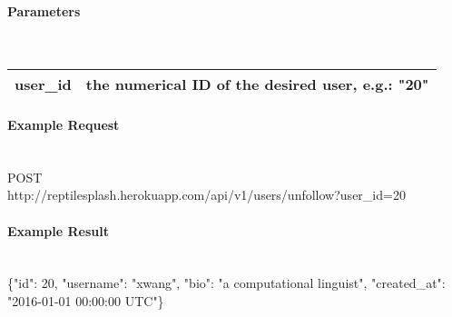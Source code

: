\documentclass{article}
\begin{document}
	\paragraph{Parameters} \mbox{} \\
	\begin{tabular}{ll}
		\hline
		user\_id & the numerical ID of the desired user, e.g.: "20" \\ \hline
	\end{tabular}
	\paragraph{Example Request} \mbox{} \\
	POST \\
	http://reptilesplash.herokuapp.com/api/v1/users/unfollow?user\_id=20
	\paragraph{Example Result} \mbox{} \\
	\{"id": 20, "username": "xwang", "bio": "a computational linguist", "created\_at": "2016-01-01 00:00:00 UTC"\}
\end{document}
